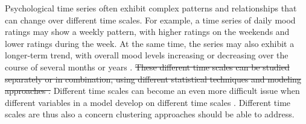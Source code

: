 \documentclass[man, 12pt, a4paper, mask, floatsintext]{apa7}
\theoremstyle{break}
\theoremstyle{plain}
\begin{document}
Psychological time series often exhibit complex patterns and relationships that can change over different time scales. For example, a time series of daily mood ratings may show a weekly pattern, with higher ratings on the weekends and lower ratings during the week. At the same time, the series may also exhibit a longer-term trend, with overall mood levels increasing or decreasing over the course of several months or years \citep[e.g.,][]{Ram2014}. \sout{These different time scales can be studied separately or in combination, using different statistical techniques and modeling approaches \citep[][]{bertenthal2007, jeronimus2019a}.} Different time scales can become an even more difficult issue when different variables in a model develop on different time scales \citep{bringmann2022b}. Different time scales are thus also a concern clustering approaches should be able to address.
\end{document}
